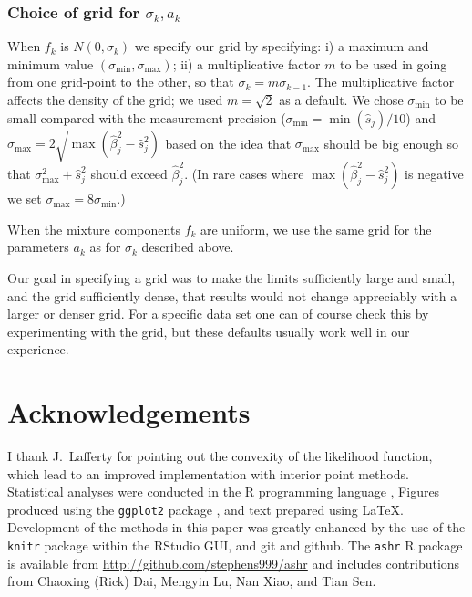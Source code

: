 \documentclass[11pt]{article}
\def\bhat{\hat{\beta}}
\def\shat{\hat{s}}
\begin{document}
\subsubsection*{Choice of grid for $\sigma_k, a_k$} \label{sec:grid}

\def\sigmamax{\sigma_{\text{max}}}
\def\sigmamin{\sigma_{\text{min}}}
When $f_k$ is $N(0,\sigma_k)$ we specify our grid by specifying: i) a maximum and minimum value $(\sigmamin,\sigmamax)$; ii) a multiplicative factor $m$ to be used
in going from one grid-point to the other, so that $\sigma_{k} = m \sigma_{k-1}$. The multiplicative factor affects the density of the grid; we used $m=\sqrt{2}$
as a default. We chose $\sigmamin$ to be small compared with the measurement precision ($\sigmamin=\min(\shat_j)/10$) and $\sigmamax= 2\sqrt{\max(\bhat_j^2-\shat_j^2)}$
based on the idea that $\sigmamax$ should be big enough so that  $\sigmamax^2 + \shat_j^2$ should exceed $\bhat_j^2$.   (In rare cases where $\max(\bhat_j^2-\shat_j^2)$
is negative we set $\sigmamax = 8\sigmamin$.)

When the mixture components $f_k$ are uniform, we use the same grid for the parameters $a_k$ as for $\sigma_k$ described above.

Our goal in specifying a grid was to make the limits sufficiently large and small, and the grid sufficiently dense, that results would not change appreciably with 
a larger or denser grid. For a specific data set one can of course check this by experimenting with the grid, but these defaults usually work well in our experience.



\section*{Acknowledgements}

I thank J.~Lafferty for pointing out the convexity of the likelihood function, which lead to an improved implementation with interior point methods. 
Statistical analyses were conducted in the {\sf R} programming language \cite{Rcore:2012}, Figures produced using the {\tt ggplot2} package \cite{ggplot2}, and text
prepared using \LaTeX. Development of the methods in this paper was greatly enhanced by the use of the {\tt knitr} package \cite{xie2013dynamic}  within the RStudio GUI, and 
git and github. The {\tt ashr} R package is available from \url{http://github.com/stephens999/ashr} and includes contributions 
from Chaoxing (Rick) Dai, Mengyin Lu, Nan Xiao, and Tian Sen. 
\end{document}
